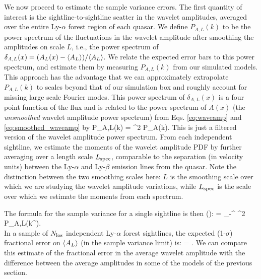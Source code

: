We now proceed to estimate the sample variance errors.
The first quantity of interest is the sightline-to-sightline scatter in the wavelet amplitudes, averaged over the entire Ly-$\alpha$ forest
region of each quasar. We define $P_{A,L}(k)$ to be the power spectrum of the fluctuations in the wavelet amplitude after smoothing
the amplitudes on scale $L$, i.e., the power spectrum
of $\delta_{A,L}(x) = (A_L(x) - \langle A_L \rangle)/\langle A_L \rangle$. We relate the expected error bars to this power spectrum, and estimate them
by measuring $P_{A,L}(k)$ from our simulated models. This approach has the advantage that we can approximately extrapolate
$P_{A,L}(k)$ to scales beyond that of our simulation box and roughly account for missing large scale Fourier modes.
This power spectrum of $\delta_{A,L}(x)$ is a four point function of the flux and is related
to the power spectrum of $A(x)$ (the {\em unsmoothed} wavelet amplitude power spectrum) from Eqs. \ref{eq:waveamp} and
\ref{eq:smoothed_waveamp} by
 \beqa
P_{A,L}(k) = ^2 P_A(k).
\label{eq:power_filt}
\eeqa
This is just a filtered version of the wavelet amplitude power spectrum. From each independent sightline, we estimate the
moments of the wavelet amplitude PDF by further averaging over a length scale $L_{\rm spec}$, comparable to the separation
(in velocity units) between the Ly-$\alpha$ and Ly-$\beta$ emission lines from the quasar. Note the distinction between the
two smoothing scales here: $L$ is the smoothing scale over which we are studying the wavelet amplitude variations, while
$L_{\rm spec}$ is the scale over which we estimate the moments from each spectrum.

The formula for the sample variance for a single sightline is then (\citealt{Lidz:2009ca}):
\beqa
{} = \int_{-\infty}^{\infty}  ^2 P_{A,L}(k^\prime). \nonumber \\
\label{eq:var_al}
\eeqa
In a sample of $N_{\rm los}$ independent Ly-$\alpha$ forest sightlines, the expected (1-$\sigma$) fractional error on $\langle A_L \rangle$ (in the sample variance limit) is:
\beqa
  =  .
\label{eq:err_mean}
\eeqa
We can compare this estimate of the fractional error in the average wavelet amplitude with the difference between the average
amplitudes in some of the models of the previous section.

